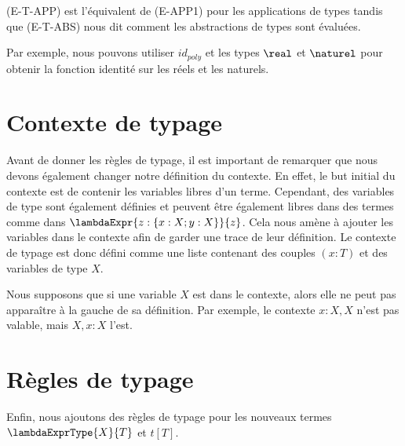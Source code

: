 
(E-T-APP) est l'équivalent de (E-APP1) pour les applications de types tandis que
(E-T-ABS) nous dit comment les abstractions de types sont évaluées.

Par exemple, nous pouvons utiliser $id_{poly}$ et les types $\real$ et
$\naturel$ pour obtenir la fonction identité sur les réels et les naturels.


\section{Contexte de typage}

Avant de donner les règles de typage, il est important de remarquer que nous
devons également changer notre définition du contexte. En effet, le but initial
du contexte est de contenir les variables libres d'un terme. Cependant, des
variables de type sont également définies et peuvent être également libres dans des
termes comme dans $\lambdaExpr{z : \left\{ x : X ; y : X \right\}}{z}$.
Cela nous amène à ajouter les variables dans le contexte afin de garder une
trace de leur définition. Le contexte de typage
est donc défini comme une liste contenant des couples $(x : T)$ et des variables
de type $X$.

Nous supposons que si une variable $X$ est dans le contexte, alors elle ne peut
pas apparaître à la gauche de sa définition. Par exemple, le contexte $x : X, X$
n'est pas valable, mais $X, x : X$ l'est.

\section{Règles de typage}

Enfin, nous ajoutons des règles de typage pour les nouveaux termes
$\lambdaExprType{X}{T}$ et $t[T]$.


